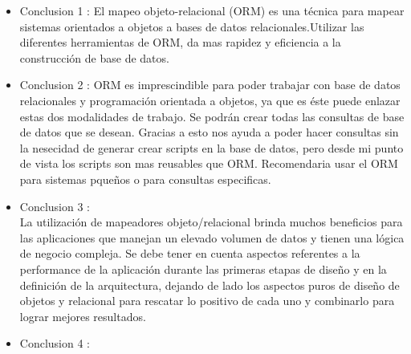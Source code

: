 \documentclass[preprint,12pt]{elsarticle}
\begin{document}
\begin{itemize}

\item Conclusion 1 :  El mapeo objeto-relacional (ORM) es una técnica para mapear sistemas orientados a objetos a bases
de datos relacionales.Utilizar las diferentes herramientas de ORM, da mas rapidez y eficiencia a la construcción de base
de datos.\\

\item Conclusion 2 : ORM es imprescindible para poder trabajar con base de datos relacionales y
programación orientada a objetos, ya que es éste puede enlazar estas dos modalidades
de trabajo. Se podrán crear todas las consultas de base de datos que se desean. Gracias a esto nos ayuda a poder hacer consultas
sin la nesecidad de generar crear scripts en la base de datos, pero desde mi punto de vista los scripts son mas reusables que ORM.
Recomendaria usar el ORM para sistemas pqueños o para consultas especificas.
 
\item Conclusion 3 : \\ La utilización de mapeadores objeto/relacional brinda muchos beneficios para las aplicaciones que manejan un elevado volumen de datos y tienen una lógica de negocio compleja. Se debe tener en cuenta aspectos referentes a la performance de la aplicación durante las primeras etapas de diseño y en la definición de la arquitectura, dejando de lado los aspectos puros de diseño de objetos y relacional para rescatar lo positivo de cada uno y combinarlo para lograr mejores resultados.

\item Conclusion 4 : \\ 
\end{itemize}


	
	\newpage
	
		 
	
	
\end{document}

